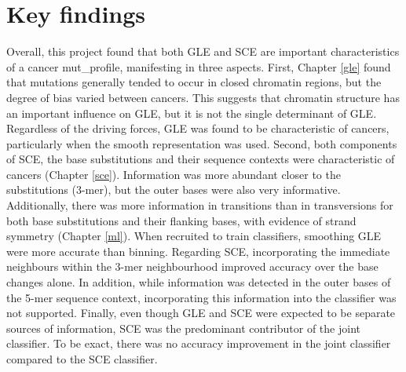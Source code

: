 \section{Key findings}
\label{intro:findings}
Overall, this project found that both GLE and SCE are important characteristics of a cancer \gls{mut_profile}, manifesting in three aspects. First, Chapter \ref{gle} found that mutations generally tended to occur in closed chromatin regions, but the degree of bias varied between cancers. This suggests that chromatin structure has an important influence on GLE, but it is not the single determinant of GLE. Regardless of the driving forces, GLE was found to be characteristic of cancers, particularly when the smooth representation was used. Second, both components of SCE, the base substitutions and their sequence contexts were characteristic of cancers (Chapter \ref{sce}). Information was more abundant closer to the substitutions (3-mer), but the outer bases were also very informative. Additionally, there was more information in \glspl{transition} than in \glspl{transversion} for both base substitutions and their flanking bases, with evidence of strand symmetry (Chapter \ref{ml}). When recruited to train classifiers, smoothing GLE were more accurate than binning. Regarding SCE, incorporating the immediate neighbours within the 3-mer neighbourhood improved accuracy over the base changes alone. In addition, while information was detected in the outer bases of the 5-mer sequence context, incorporating this information into the classifier was not supported. Finally, even though GLE and SCE were expected to be separate sources of information, SCE was the predominant contributor of the joint classifier. To be exact, there was no accuracy improvement in the joint classifier compared to the SCE classifier.
